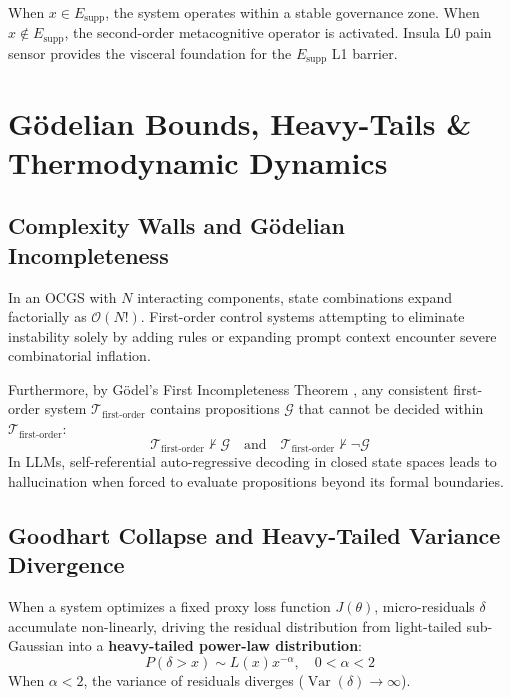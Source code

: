 \documentclass[journal,twocolumn,10pt]{IEEEtran}
\begin{document}
When $x \in E_{\text{supp}}$, the system operates within a stable governance zone. When $x \notin E_{\text{supp}}$, the second-order metacognitive operator is activated. Insula L0 pain sensor provides the visceral foundation for the $E_{\text{supp}}$ L1 barrier.

\section{G\"odelian Bounds, Heavy-Tails \& Thermodynamic Dynamics}
\subsection{Complexity Walls and G\"odelian Incompleteness}
In an OCGS with $N$ interacting components, state combinations expand factorially as $\mathcal{O}(N!)$. First-order control systems attempting to eliminate instability solely by adding rules or expanding prompt context encounter severe combinatorial inflation.

Furthermore, by G\"odel's First Incompleteness Theorem \cite{godel1931formally}, any consistent first-order system $\mathcal{T}_{\text{first-order}}$ contains propositions $\mathcal{G}$ that cannot be decided within $\mathcal{T}_{\text{first-order}}$:
\begin{equation}
\mathcal{T}_{\text{first-order}} \nvdash \mathcal{G} \quad \text{and} \quad \mathcal{T}_{\text{first-order}} \nvdash \neg \mathcal{G}
\end{equation}
In LLMs, self-referential auto-regressive decoding in closed state spaces leads to hallucination when forced to evaluate propositions beyond its formal boundaries.

\subsection{Goodhart Collapse and Heavy-Tailed Variance Divergence}
When a system optimizes a fixed proxy loss function $J(\theta)$, micro-residuals $\delta$ accumulate non-linearly, driving the residual distribution from light-tailed sub-Gaussian into a \textbf{heavy-tailed power-law distribution}:
\begin{equation}
P(\delta > x) \sim L(x) x^{-\alpha}, \quad 0 < \alpha < 2
\end{equation}
When $\alpha < 2$, the variance of residuals diverges ($\operatorname{Var}(\delta) \to \infty$).
\end{document}
